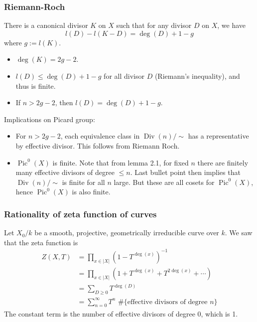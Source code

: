 \documentclass[letterpaper,11pt]{article}
\DeclareMathOperator{\Div}{Div}
\DeclareMathOperator{\Pic}{Pic}
\begin{document}
\subsubsection{Riemann-Roch}
\begin{thm}
There is a canonical divisor $K$ on $X$ such that for any divisor $D$ on $X$, we have
\[
l(D) - l(K-D) = \deg(D) + 1 - g
\]
where $g := l(K)$.
\end{thm}
\begin{cor} \hspace{1mm}
\begin{itemize}
    \item $\deg(K) = 2g-2$.
    \item $l(D) \leq \deg(D) + 1 -g$ for all divisor $D$ (Riemann's inequality), and thus is finite.
    \item If $n > 2g-2$, then $l(D) = \deg(D) + 1 - g$.
\end{itemize}
\end{cor}
\begin{cor} Implications on Picard group:
\begin{itemize}
    \item For $n > 2g-2$, each equivalence class in $\Div(n)/\sim$ has a representative by effective divisor. This follows from Riemann Roch. 
    \item $\Pic^0(X)$ is finite. Note that from lemma 2.1, for fixed $n$ there are finitely many effective divisors of degree $\leq n$. Last bullet point then implies that $\Div(n)/\sim$ is finite for all $n$ large. But these are all cosets for $\Pic^0(X)$, hence $\Pic^0(X)$ is also finite.
\end{itemize}
\end{cor}
\subsubsection{Rationality of zeta function of curves}
Let $X_0/k$ be a smooth, projective, geometrically irreducible curve over $k$. We saw that the zeta function is
\begin{align*}
    Z(X,T) &= \prod_{x \in |X|} \left(1 - T^{\deg(x)}\right)^{-1} \nonumber\\
    &= \prod_{x \in |X|} ( 1 + T^{\deg(x)} + T^{2\deg(x)} + \cdots ) \nonumber\\
    &= \sum_{D \ge 0} T^{\deg(D)} \nonumber\\
    &= \sum_{n=0}^{\infty} T^n \text{ \#\{effective divisors of degree $n$\}} \label{zeta_for_curve} \tag{$\star$}
\end{align*}
The constant term is the number of effective divisors of degree 0, which is 1.
\end{document}
